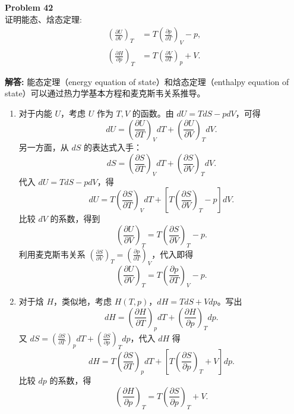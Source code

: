 \documentclass[12pt, a4paper, oneside]{ctexart}
\newenvironment{solution}{\par\noindent\textbf{解答:}\quad}{\par}
\begin{document}
\begin{mdframed}[backgroundcolor=gray!10, linewidth=0pt]
    \textbf{Problem 42} \\
    证明能态、焓态定理:
    \[
    \begin{aligned}
        \left(\frac{\partial U}{\partial V}\right)_T &= T\left(\frac{\partial p}{\partial T}\right)_V - p, \\
        \left(\frac{\partial H}{\partial p}\right)_T &= T\left(\frac{\partial V}{\partial T}\right)_p + V.
    \end{aligned}
    \]
\end{mdframed}
\begin{solution}
    能态定理（energy equation of state）和焓态定理（enthalpy equation of state）可以通过热力学基本方程和麦克斯韦关系推导。
    \begin{enumerate}
        \item 对于内能 $U$，考虑 $U$ 作为 $T, V$ 的函数。由 $dU = T dS - p dV$，可得
        \[
        dU = \left(\frac{\partial U}{\partial T}\right)_V dT + \left(\frac{\partial U}{\partial V}\right)_T dV.
        \]
        另一方面，从 $dS$ 的表达式入手：
        \[
        dS = \left(\frac{\partial S}{\partial T}\right)_V dT + \left(\frac{\partial S}{\partial V}\right)_T dV.
        \]
        代入 $dU = T dS - p dV$，得
        \[
        dU = T\left(\frac{\partial S}{\partial T}\right)_V dT + \left[ T\left(\frac{\partial S}{\partial V}\right)_T - p \right] dV.
        \]
        比较 $dV$ 的系数，得到
        \[
        \left(\frac{\partial U}{\partial V}\right)_T = T\left(\frac{\partial S}{\partial V}\right)_T - p.
        \]
        利用麦克斯韦关系 $\left(\frac{\partial S}{\partial V}\right)_T = \left(\frac{\partial p}{\partial T}\right)_V$，代入即得
        \[
        \left(\frac{\partial U}{\partial V}\right)_T = T\left(\frac{\partial p}{\partial T}\right)_V - p.
        \]
        \item 对于焓 $H$，类似地，考虑 $H(T, p)$，$dH = T dS + V dp$。写出
        \[
        dH = \left(\frac{\partial H}{\partial T}\right)_p dT + \left(\frac{\partial H}{\partial p}\right)_T dp.
        \]
        又 $dS = \left(\frac{\partial S}{\partial T}\right)_p dT + \left(\frac{\partial S}{\partial p}\right)_T dp$，代入 $dH$ 得
        \[
        dH = T\left(\frac{\partial S}{\partial T}\right)_p dT + \left[ T\left(\frac{\partial S}{\partial p}\right)_T + V \right] dp.
        \]
        比较 $dp$ 的系数，得
        \[
        \left(\frac{\partial H}{\partial p}\right)_T = T\left(\frac{\partial S}{\partial p}\right)_T + V.
\]
\end{enumerate}
\end{solution}
\end{document}
